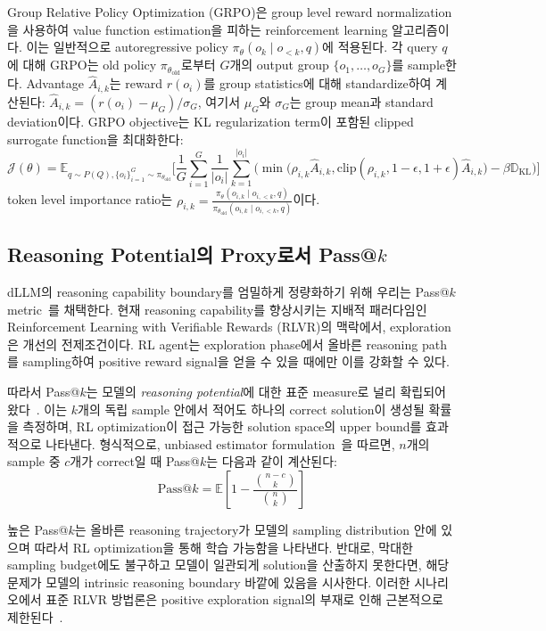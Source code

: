 Group Relative Policy Optimization (GRPO)은 group level reward normalization을 사용하여 value function estimation을 피하는 reinforcement learning 알고리즘이다. 이는 일반적으로 autoregressive policy $\pi_\theta(o_k \mid o_{<k}, q)$에 적용된다.
각 query $q$에 대해 GRPO는 old policy $\pi_{\theta_{\text{old}}}$로부터 $G$개의 output group $\{o_1, \dots, o_G\}$를 sample한다. Advantage $\hat{A}_{i,k}$는 reward $r(o_i)$를 group statistics에 대해 standardize하여 계산된다: $\hat{A}_{i,k} = (r(o_i) - \mu_G) / \sigma_G$, 여기서 $\mu_G$와 $\sigma_G$는 group mean과 standard deviation이다.
GRPO objective는 KL regularization term이 포함된 clipped surrogate function을 최대화한다:
\begin{equation}
\mathcal{J}(\theta) = \mathbb{E}_{q \sim P(Q), \{o_i\}_{i=1}^G \sim \pi_{\theta_{\text{old}}}} \Bigg[ \frac{1}{G} \sum_{i=1}^G \frac{1}{|o_i|} \sum_{k=1}^{|o_i|} \Big( \min \big( \rho_{i,k} \hat{A}_{i,k}, \text{clip}(\rho_{i,k}, 1-\epsilon, 1+\epsilon) \hat{A}_{i,k} \big) - \beta \mathbb{D}_{\text{KL}} \Big) \Bigg]
\end{equation}
token level importance ratio는 $\rho_{i,k} = \frac{\pi_\theta(o_{i,k} \mid o_{i,<k}, q)}{\pi_{\theta_{\text{old}}}(o_{i,k} \mid o_{i,<k}, q)}$이다.

\subsection{Reasoning Potential의 Proxy로서 Pass@$k$}

dLLM의 reasoning capability boundary를 엄밀하게 정량화하기 위해 우리는 Pass@$k$ metric~\cite{chen2021evaluating,yue2025does}를 채택한다. 현재 reasoning capability를 향상시키는 지배적 패러다임인 Reinforcement Learning with Verifiable Rewards (RLVR)의 맥락에서, exploration은 개선의 전제조건이다. RL agent는 exploration phase에서 올바른 reasoning path를 sampling하여 positive reward signal을 얻을 수 있을 때에만 이를 강화할 수 있다.

따라서 Pass@$k$는 모델의 \textit{reasoning potential}에 대한 표준 measure로 널리 확립되어 왔다~\cite{yue2025does,liu2025prorl,zhang2025interplay}.
이는 $k$개의 독립 sample 안에서 적어도 하나의 correct solution이 생성될 확률을 측정하며, RL optimization이 접근 가능한 solution space의 upper bound를 효과적으로 나타낸다. 형식적으로, unbiased estimator formulation~\cite{chen2021evaluating,yue2025does}을 따르면, $n$개의 sample 중 $c$개가 correct일 때 Pass@$k$는 다음과 같이 계산된다:
\begin{equation}
\text{Pass@}k = \mathbb{E}\left[1 - \frac{\binom{n-c}{k}}{\binom{n}{k}}\right]
\end{equation}

높은 Pass@$k$는 올바른 reasoning trajectory가 모델의 sampling distribution 안에 있으며 따라서 RL optimization을 통해 학습 가능함을 나타낸다. 반대로, 막대한 sampling budget에도 불구하고 모델이 일관되게 solution을 산출하지 못한다면, 해당 문제가 모델의 intrinsic reasoning boundary 바깥에 있음을 시사한다. 이러한 시나리오에서 표준 RLVR 방법론은 positive exploration signal의 부재로 인해 근본적으로 제한된다~\cite{yue2025does}.
